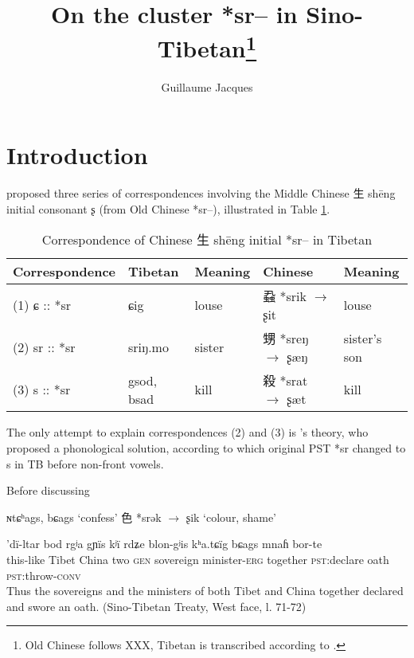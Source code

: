 \documentclass[oldfontcommands,oneside,a4paper,11pt]{article}
\newcommand{\ipa}[1]{{\phon #1}} %
\newcommand{\zh}[1]{{\cn #1}}
\begin{document}
 


\title{On the cluster *sr-- in Sino-Tibetan\footnote{Old Chinese follows XXX, Tibetan is transcribed according to \citet{jacques12transcription}.}}
\author{Guillaume Jacques}
\maketitle

\section{Introduction}

\citet{benedict72} proposed three series of correspondences involving the Middle Chinese \zh{生} shēng initial consonant \ipa{ʂ} (from Old Chinese *\ipa{sr--}), illustrated in Table \ref{tab:sr.chinese}.

\begin{table}[H]
\caption{Correspondence of Chinese \zh{生} shēng initial *sr-- in Tibetan} \label{tab:sr.chinese}
\begin{tabular}{lllll}
\toprule
Correspondence & Tibetan & Meaning & Chinese & Meaning \\
\midrule
(1) \ipa{ɕ} :: *\ipa{sr} & \ipa{ɕig} & louse & \zh{蝨} *srik $\rightarrow$ \ipa{ʂit} & louse \\
(2) \ipa{sr} :: *\ipa{sr} & \ipa{sriŋ.mo} & sister & \zh{甥} *sreŋ $\rightarrow$ \ipa{ʂæŋ} & sister's son \\
(3) \ipa{s} :: *\ipa{sr} & \ipa{gsod, bsad} & kill & \zh{殺} *srat $\rightarrow$ \ipa{ʂæt} & kill \\
\bottomrule
\end{tabular}
\end{table}

The only attempt to explain  correspondences (2) and (3) is \citet[25]{handel02r}'s theory, who proposed a phonological solution, according to which original PST *\ipa{sr} changed to s in TB before non-front vowels. 

Before discussing 
\citet{jacques12internal}

\ipa{ɴtɕʰags}, \ipa{bɕags} `confess' \zh{色} *srək $\rightarrow$ \ipa{ʂik} `colour, shame'





\citet[40,80]{licoblin87}


\begin{exe}
\ex
\gll
\ipa{'dï-ltar} 	\ipa{bod} 	\ipa{rgʲa} 	\ipa{gɲïs} 	\ipa{kʲï} 	\ipa{rdʑe} \ipa{blon-gʲis} 	\ipa{kʰa.tɕïg} 	\ipa{bɕags} 	\ipa{mnaɦ} 	\ipa{bor-te} \\
this-like Tibet China two \textsc{gen} sovereign minister-\textsc{erg} together \textsc{pst}:declare oath \textsc{pst}:throw-\textsc{conv} \\
\glt Thus the sovereigns and the ministers of both Tibet and China together declared and swore an oath. (Sino-Tibetan Treaty, West face, l. 71-72)
\end{exe}
\end{document}
